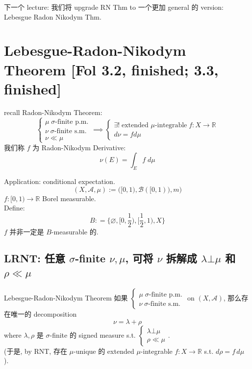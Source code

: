 \documentclass[lang=cn,11pt]{elegantbook}
\begin{document}
下一个 lecture: 我们将 upgrade RN Thm to 一个更加 general 的 version: Lebesgue Radon Nikodym Thm.











\chapter{Lebesgue-Radon-Nikodym Theorem [Fol 3.2, finished; 3.3, finished]}
recall Radon-Nikodym Theorem: \[
\begin{cases}
    \mu \; \sigma\text{-finite p.m.} \\
     \nu \; \sigma\text{-finite s.m.} \\
     \nu \ll \mu
\end{cases}\implies \begin{cases}
    \exists !\; \text{extended } \mu\text{-integrable}\; f: X\to \mathbb{R}\\
    d\nu = f d\mu
\end{cases}
\]
我们称 $f$ 为 Radon-Nikodym Derivative:\[
\nu(E) = \int_E f \; d\mu
\]


\begin{example}
Application: conditional expectation.\\
\[
(X,\mathcal{A},\mu)  := \bigg([0,1), \mathcal{B}([0,1)), m\bigg)
\]
$f:[0,1) \to \mathbb{R}$ Borel measurable.\\
Define: \[
B: = \{\varnothing, [0,\frac{1}{2}), [\frac{1}{2},1),X  \}
\]
$f$ 并非一定是 $B$-measurable 的. 

\end{example}



\section{LRNT: 任意 $\sigma$-finite $\nu,\mu$, 可将 $\nu$ 拆解成 $\lambda \bot \mu$ 和 $\rho \ll \mu$}
\begin{theorem}{Lebesgue-Radon-Nikodym Theorem}
    如果 $\begin{cases}
    \mu \; \sigma\text{-finite p.m.} \\
     \nu \; \sigma\text{-finite s.m.} 
\end{cases}$ on $(X,\mathcal{A})$, 那么存在唯一的 decomposition \[
\nu = \lambda + \rho 
\]where $\lambda, \rho$ 是 $\sigma$-finite 的 signed measure s.t. $\begin{cases}
    \lambda \bot \mu \\
    \rho \ll \mu
\end{cases}$.\\
(于是, by RNT, 存在 $\mu$-unique 的 extended $\mu$-integrable $f:X\to \mathbb{R}$ s.t. \(d \rho = f \,d\mu\) ).
\end{theorem}
\end{document}
